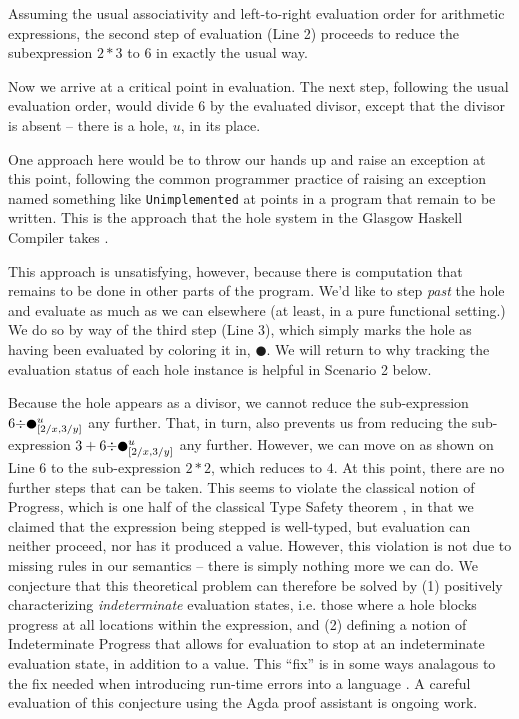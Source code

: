 

Assuming the usual associativity and left-to-right evaluation order for arithmetic expressions, the second step of evaluation (Line 2) proceeds to reduce the subexpression $2 * 3$ to $6$ in exactly the usual way. 
%

Now we arrive at a critical point in evaluation. The next step, following the usual evaluation order, would divide $6$ by the evaluated divisor, except that the divisor is 
absent -- there is a hole, $u$, in its place. 

One approach here would be to throw our hands up and raise an exception at this point, following the common programmer practice of raising an exception named something like \texttt{Unimplemented} at points in a program that remain to be written. This is the approach that the hole system in the Glasgow Haskell Compiler takes \cite{GCHWIKI}. 

This approach is unsatisfying, however, because there is computation that remains to be done in other parts of the program. We'd like to step \emph{past} the hole and evaluate as much as we can elsewhere (at least, in a pure functional setting.) We do so by way of the third step (Line 3), which simply marks the hole as having been evaluated by coloring it in, $\CIRCLE$. We will return to why tracking the evaluation status of each hole instance is helpful in Scenario 2 below.

Because the hole appears as a divisor, we cannot reduce the sub-expression $6 {\div} \heholechk{\metavar}_{[2/x, 3/y]}$ any further. That, in turn, also prevents us from reducing the sub-expression $3 + 6 {\div} \heholechk{\metavar}_{[2/x, 3/y]}$ any further. However, we can move on as shown on Line 6 to the sub-expression $2 * 2$, which reduces to $4$. At this point, there are no further steps that can be taken. 
%
This seems to violate the classical notion of Progress, which is one half of the classical Type Safety theorem \cite{milner1978theory,pfpl}, in that we claimed that the expression being stepped is well-typed, but 
evaluation can neither proceed, nor has it produced a value. However, this violation is not due to missing rules in our semantics -- there is simply nothing more we can do. We conjecture that this theoretical problem can therefore be solved by (1) positively characterizing \emph{indeterminate} 
evaluation states, i.e. those where a hole blocks progress at all locations
within the expression, and (2) defining
a notion of Indeterminate Progress that allows for evaluation to stop at an 
indeterminate evaluation state, in addition to a value. This ``fix'' is in some ways analagous to the fix needed when introducing 
run-time errors into a language \cite{pfpl}. A careful evaluation of this conjecture using the Agda proof assistant \cite{norell2009dependently} is ongoing work.

